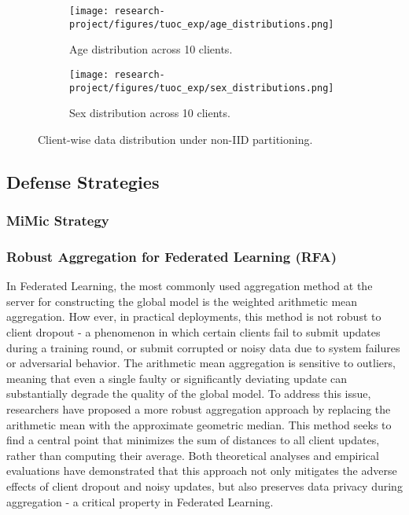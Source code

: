 \documentclass[12pt, a4paper]{article}
\begin{document}
\begin{figure}[H]
\centering
\begin{subfigure}{0.49\textwidth}
  \centering
  \texttt{[image: research-project/figures/tuoc\_exp/age\_distributions.png]}
  \caption{Age distribution across 10 clients.}
  \label{fig:age_distributions}
\end{subfigure}
\hfill
\begin{subfigure}{0.49\textwidth}
  \centering
  \texttt{[image: research-project/figures/tuoc\_exp/sex\_distributions.png]}
  \caption{Sex distribution across 10 clients.}
  \label{fig:sex_distributions}
\end{subfigure}
\caption{Client-wise data distribution under non-IID partitioning.}
\label{fig:client_distributions}
\end{figure}


\subsection{Defense Strategies}
\subsubsection{MiMic Strategy}
\subsubsection{Robust Aggregation for Federated Learning (RFA)}
In Federated Learning, the most commonly used aggregation method at the server for constructing the global model is the weighted arithmetic mean aggregation. How ever, in practical deployments, this method is not robust to client dropout - a phenomenon in which certain clients fail to submit updates during a training round, or submit corrupted or noisy data due to system failures or adversarial behavior. The arithmetic mean aggregation is sensitive to outliers, meaning that even a single faulty or significantly deviating update can substantially degrade the quality of the global model. To address this issue, researchers have proposed a more robust aggregation approach by replacing the arithmetic mean with the approximate geometric median. This method seeks to find a central point that minimizes the sum of distances to all client updates, rather than computing their average. Both theoretical analyses and empirical evaluations have demonstrated that this approach not only mitigates the adverse effects of client dropout and noisy updates, but also preserves data privacy during aggregation - a critical property in Federated Learning.
\end{document}
